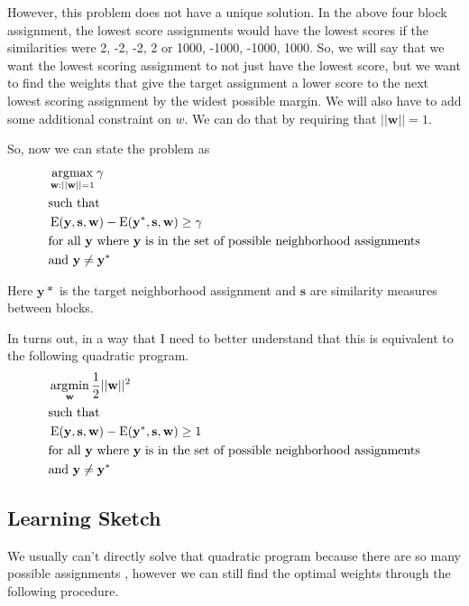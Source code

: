 However, this problem does not have a unique solution. In the above
four block assignment, the lowest score assignments would have the
lowest scores if the similarities were 2, -2, -2, 2 or 1000, -1000,
-1000, 1000. So, we will say that we want the lowest scoring
assignment to not just have the lowest score, but we want to find the
weights that give the target assignment a lower score to the next
lowest scoring assignment by the widest possible margin. We will also
have to add some additional constraint on $w$. We can do that by
requiring that $||\mathbf{w}||=1$.

So, now we can state the problem as 
%
\begin{align*}
&\operatorname*{\arg\!\max}_{\mathbf{w}:||\mathbf{w}||=1} \mathbf{\gamma} \\
&\text{such that} \\
&\operatorname{E}(\mathbf{y}, \mathbf{s}, \mathbf{w})
- \operatorname{E}(\mathbf{y}^*, \mathbf{s}, \mathbf{w}) \geq \gamma\\ 
&\text{for all } \mathbf{y} \text{ where } \mathbf{y} \text{ is in the set of
  possible neighborhood assignments}\\
&\text{and } \mathbf{y} \neq \mathbf{y}^*
\end{align*}
%

Here $\mathbf{y}*$ is the target neighborhood assignment and $\mathbf{s}$
are similarity measures between blocks. 


In turns out, in a way that I need to better understand that this is
equivalent to the following quadratic program.
%
\begin{align*}
&\operatorname*{\arg\!\min}_{\mathbf{w}} \frac{1}{2}||\mathbf{w}||^2 \\
&\text{such that} \\
&\operatorname{E}(\mathbf{y}, \mathbf{s}, \mathbf{w})
- \operatorname{E}(\mathbf{y}^*, \mathbf{s}, \mathbf{w}) \geq 1 \\ 
&\text{for all } \mathbf{y} \text{ where } \mathbf{y} \text{ is in the set of
  possible neighborhood assignments}\\
&\text{and } \mathbf{y} \neq \mathbf{y}^*
\end{align*}


\subsection{Learning Sketch}
We usually can't directly solve that quadratic program because there
are so many possible assignments , however we can still find the
optimal weights through the following procedure.

